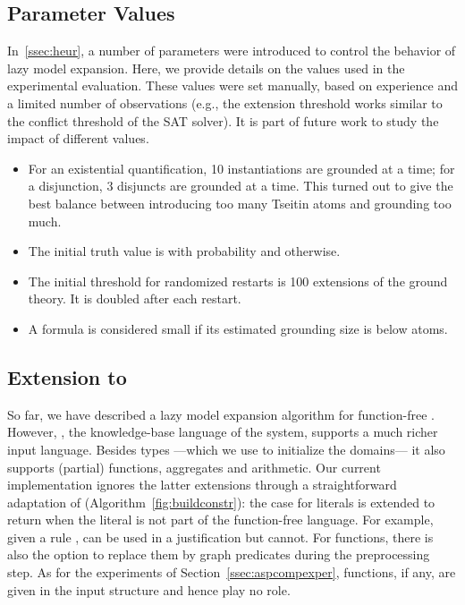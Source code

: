 \documentclass[11pt]{article}
\newcommand{\logicname}[1]{\text{\sc #1}\xspace}
\newcommand{\idp}{\logicname{IDP}}
\newcommand{\fodotidp}{\logicname{FO(\ensuremath{\cdot})\ensuremath{^{\mathtt{IDP}}}}}
\newcommand{\foid}{\logicname{FO(\ensuremath{ID})}}
\theoremstyle{plain}
\theoremstyle{definition}
\theoremstyle{example_basic}
\theoremstyle{example_contd}
\theoremstyle{plain}
\newcommand{\change}[1]{#1}
\begin{document}
\subsection{Parameter Values}
\change{In~\ref{ssec:heur}, a number of parameters were introduced to control the behavior of lazy model expansion. Here, we provide details on the values used in the experimental evaluation. These values were set manually, based on experience and a limited number of observations (e.g., the extension threshold works similar to the conflict threshold of the SAT solver). It is part of future work to study the impact of different values.
\begin{itemize}
  \item For an existential quantification, 10 instantiations are grounded at a time; for a disjunction, 3 disjuncts are grounded at a time. This turned out to give the best balance between introducing too many Tseitin atoms and grounding too much.
  \item The initial truth value is  with probability  and  otherwise.
  \item The initial threshold for randomized restarts is 100 extensions of the ground theory. It is doubled after each restart.
  \item A formula is considered small if its estimated grounding size is below  atoms. 
\end{itemize}
}

\subsection{Extension to \fodotidp}
So far, we have described a lazy model expansion algorithm for
function-free \foid.  However, \fodotidp, the knowledge-base language
of the \idp system, supports a much richer input language.
\change{Besides types ---which we use to initialize the domains--- it
  also supports (partial) functions, aggregates and arithmetic. Our
  current implementation ignores the latter extensions through a
  straightforward adaptation of
  \buildconstr(Algorithm~\ref{fig:buildconstr}): the case for literals
  is extended to return \algfalse when the literal is not part of the
  function-free \foid language. For example, given a rule ,  can be used in a justification
  but  cannot. For functions, there is also the option to
replace them by graph predicates during the preprocessing step. As for
the experiments of Section~\ref{ssec:aspcompexper}, functions, if any,
are given in the input structure and hence play no role.
}
\end{document}
